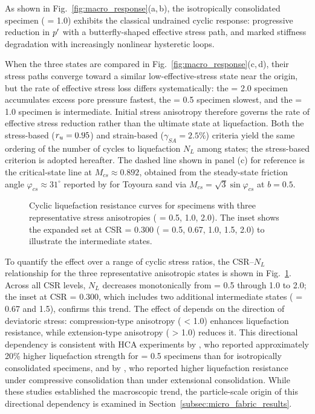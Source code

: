 As shown in Fig.~\ref{fig:macro_response}(a,\,b), the isotropically consolidated specimen (\Kzero{} = 1.0) exhibits the classical undrained cyclic response: progressive reduction in $p^\prime$ with a butterfly-shaped effective stress path, and marked stiffness degradation with increasingly nonlinear hysteretic loops.

When the three \Kzero{} states are compared in Fig.~\ref{fig:macro_response}(c,\,d), their stress paths converge toward a similar low-effective-stress state near the origin, but the rate of effective stress loss differs systematically: the \Kzero{} = 2.0 specimen accumulates excess pore pressure fastest, the \Kzero{} = 0.5 specimen slowest, and the \Kzero{} = 1.0 specimen is intermediate. Initial stress anisotropy therefore governs the rate of effective stress reduction rather than the ultimate state at liquefaction. Both the stress-based ($r_u = 0.95$) and strain-based ($\gamma_{SA} = 2.5\%$) criteria yield the same ordering of the number of cycles to liquefaction $N_L$ among \Kzero{} states; the stress-based criterion is adopted hereafter. The dashed line shown in panel (c) for reference is the critical-state line at $M_{cs}\approx 0.892$, obtained from the steady-state friction angle $\varphi_{cs}\approx 31^{\circ}$ reported by \citet{VerdugoIshihara1996} for Toyoura sand via $M_{cs}=\sqrt{3}\sin\varphi_{cs}$ at $b=0.5$.

\begin{figure}
  \centering
  \caption{Cyclic liquefaction resistance curves for specimens with three representative stress anisotropies (\Kzero{} = 0.5, 1.0, 2.0). The inset shows the expanded \Kzero{} set at CSR = 0.300 (\Kzero{} = 0.5, 0.67, 1.0, 1.5, 2.0) to illustrate the intermediate states.}
  \label{fig:liq_resistance_curves}
\end{figure}

To quantify the \Kzero{} effect over a range of cyclic stress ratios, the CSR--$N_L$ relationship for the three representative anisotropic states is shown in Fig.~\ref{fig:liq_resistance_curves}. Across all CSR levels, $N_L$ decreases monotonically from \Kzero{} = 0.5 through 1.0 to 2.0; the inset at CSR = 0.300, which includes two additional intermediate states (\Kzero{} = 0.67 and 1.5), confirms this trend. The effect of \Kzero{} depends on the direction of deviatoric stress: compression-type anisotropy (\Kzero{} < 1.0) enhances liquefaction resistance, while extension-type anisotropy (\Kzero{} > 1.0) reduces it. This directional dependency is consistent with HCA experiments by \citet{Vargas2020}, who reported approximately 20\% higher liquefaction strength for \Kzero{} = 0.5 specimens than for isotropically consolidated specimens, and by \citet{Zhao2024}, who reported higher liquefaction resistance under compressive consolidation than under extensional consolidation. While these studies established the macroscopic trend, the particle-scale origin of this directional dependency is examined in Section~\ref{subsec:micro_fabric_results}.

